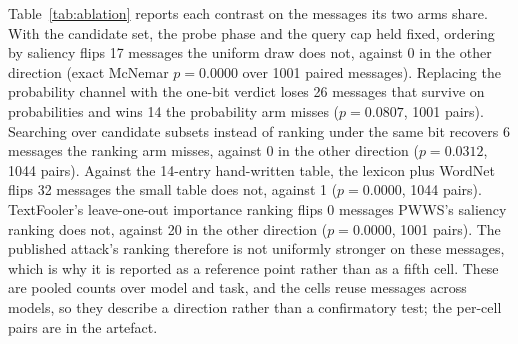 Table~\ref{tab:ablation} reports each contrast on the messages its two arms share.
With the candidate set, the probe phase and the query cap held fixed, ordering by saliency flips 17 messages the uniform draw does not, against 0 in the other direction (exact McNemar $p=0.0000$ over 1001 paired messages).
Replacing the probability channel with the one-bit verdict loses 26 messages that survive on probabilities and wins 14 the probability arm misses ($p=0.0807$, 1001 pairs).
Searching over candidate subsets instead of ranking under the same bit recovers 6 messages the ranking arm misses, against 0 in the other direction ($p=0.0312$, 1044 pairs).
Against the 14-entry hand-written table, the lexicon plus WordNet flips 32 messages the small table does not, against 1 ($p=0.0000$, 1044 pairs).
TextFooler's leave-one-out importance ranking flips 0 messages PWWS's saliency ranking does not, against 20 in the other direction ($p=0.0000$, 1001 pairs). The published attack's ranking therefore is not uniformly stronger on these messages, which is why it is reported as a reference point rather than as a fifth cell.
These are pooled counts over model and task, and the cells reuse messages across models, so they describe a direction rather than a confirmatory test; the per-cell pairs are in the artefact.
